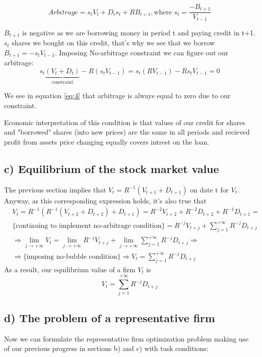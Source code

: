 \documentclass{article}
\begin{document}
\begin{equation*}
\textit{Arbitrage} = s_t V_t + D_t s_t + RB_{t+1}, \text{where }s_t = \frac{-B_{t+1}}{V_{t-1}}
\end{equation*}

$B_{t+1}$ is negative as we are borrowing money in period t and paying credit in t+1. $s_t$ shares we bought on this credit, that's why we see that we borrow $B_{t+1} = -s_t V_{t-1}$.
Imposing No-arbitrage constraint we can figure out our arbitrage:
\begin{equation} \label{eq:4}
	s_t\underbrace{(V_t + D_t)}_\text{constraint} - R(s_t V_{t-1}) = s_t (RV_{t-1}) - Rs_t V_{t-1} = 0
\end{equation}

We see in  equation \ref{eq:4} that arbitrage is always equal to zero due to our constraint.

Economic interpretation of this condition is that values of our credit for shares and "borrowed" shares (into new prices) are the same in all periods and recieved profit from assets price changing equally covers intrest on the loan.

\subsection*{c) Equilibrium of the stock market value} \label{subsec:c}

The previous section implies that $ V_t = R^{-1}(V_{t+1} + D_{t+1}) $ on date t for $ V_t $. Anyway, as this corresponding expression holds, it's also true that
\begin{align*}
	& V_t = R^{-1}(R^{-1}(V_{t+2} + D_{t+2}) + D_{t+1}) = R^{-2}V_{t+2} + R^{-2}D_{t+2} + R^{-1}D_{t+1} = \\
	& \text{\{continuing to implement no-arbitrage condition\}} = R^{-j}V_{t+j} + \sum_{j=1}^{+\infty}R^{-j}D_{t+j} \\
	& \Rightarrow \lim_{j \rightarrow +\infty} V_t = \lim_{j \rightarrow +\infty}R^{-j}V_{t+j} + \lim_{j \rightarrow +\infty}\sum_{j=1}^{+\infty}R^{-j}D_{t+j} \Rightarrow \\ 
	& \Rightarrow \text{\{imposing no-bubble condition\}} \Rightarrow V_t = \sum_{j=1}^{+\infty}R^{-j}D_{t+j}
\end{align*}
As a result, our equilibrium value of a firm $ V_t $ is
\begin{equation}
	V_t = \sum_{j=1}^{+\infty}R^{-j}D_{t+j}
\end{equation}

\subsection*{d) The problem of a representative firm}
Now we can formulate the representative firm optimization problem making use of our previous progress in sections b) and c) with task conditions:
\end{document}
